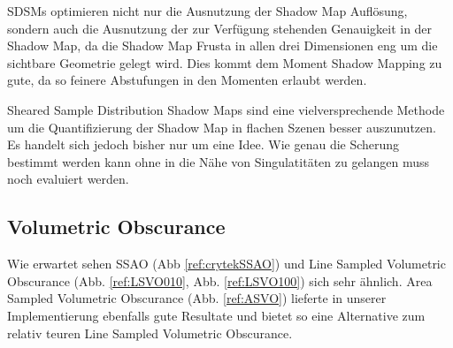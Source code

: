\documentclass[runningheaders,a4paper]{llncs}
\begin{document}
SDSMs optimieren nicht nur die Ausnutzung der Shadow Map Auflösung, sondern auch die Ausnutzung der zur Verfügung stehenden Genauigkeit in der Shadow Map, da die Shadow Map Frusta in allen drei Dimensionen eng um die sichtbare Geometrie gelegt wird.
Dies kommt dem Moment Shadow Mapping zu gute, da so feinere Abstufungen in den Momenten erlaubt werden.

Sheared Sample Distribution Shadow Maps sind eine vielversprechende Methode um die Quantifizierung der Shadow Map in flachen Szenen besser auszunutzen.
Es handelt sich jedoch bisher nur um eine Idee.
Wie genau die Scherung bestimmt werden kann ohne in die Nähe von Singulatitäten zu gelangen muss noch evaluiert werden.


\subsection{Volumetric Obscurance} \label{ssec:voResult}
Wie erwartet sehen SSAO (Abb \ref{ref:crytekSSAO}) und Line Sampled Volumetric Obscurance 
(Abb. \ref{ref:LSVO010}, Abb. \ref{ref:LSVO100}) sich sehr ähnlich. 
Area Sampled Volumetric Obscurance (Abb. \ref{ref:ASVO})
lieferte in unserer Implementierung ebenfalls gute Resultate und bietet so eine Alternative 
zum relativ teuren Line Sampled Volumetric Obscurance. 
\end{document}
